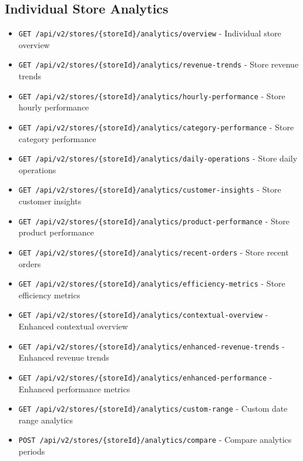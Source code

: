 \documentclass[11pt,a4paper]{article}
\begin{document}
\subsection{Individual Store Analytics}
\begin{itemize}[leftmargin=*]
    \item \texttt{GET /api/v2/stores/\{storeId\}/analytics/overview} - Individual store overview
    \item \texttt{GET /api/v2/stores/\{storeId\}/analytics/revenue-trends} - Store revenue trends
    \item \texttt{GET /api/v2/stores/\{storeId\}/analytics/hourly-performance} - Store hourly performance
    \item \texttt{GET /api/v2/stores/\{storeId\}/analytics/category-performance} - Store category performance
    \item \texttt{GET /api/v2/stores/\{storeId\}/analytics/daily-operations} - Store daily operations
    \item \texttt{GET /api/v2/stores/\{storeId\}/analytics/customer-insights} - Store customer insights
    \item \texttt{GET /api/v2/stores/\{storeId\}/analytics/product-performance} - Store product performance
    \item \texttt{GET /api/v2/stores/\{storeId\}/analytics/recent-orders} - Store recent orders
    \item \texttt{GET /api/v2/stores/\{storeId\}/analytics/efficiency-metrics} - Store efficiency metrics
    \item \texttt{GET /api/v2/stores/\{storeId\}/analytics/contextual-overview} - Enhanced contextual overview
    \item \texttt{GET /api/v2/stores/\{storeId\}/analytics/enhanced-revenue-trends} - Enhanced revenue trends
    \item \texttt{GET /api/v2/stores/\{storeId\}/analytics/enhanced-performance} - Enhanced performance metrics
    \item \texttt{GET /api/v2/stores/\{storeId\}/analytics/custom-range} - Custom date range analytics
    \item \texttt{POST /api/v2/stores/\{storeId\}/analytics/compare} - Compare analytics periods
\end{itemize}
\end{document}
